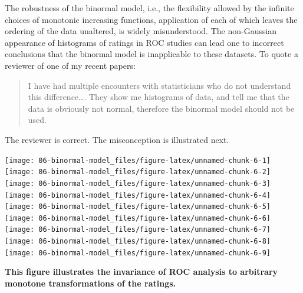\documentclass[
]{book}
\begin{document}
The robustness of the binormal model, i.e., the flexibility allowed by the infinite choices of monotonic increasing functions, application of each of which leaves the ordering of the data unaltered, is widely misunderstood. The non-Gaussian appearance of histograms of ratings in ROC studies can lead one to incorrect conclusions that the binormal model is inapplicable to these datasets. To quote a reviewer of one of my recent papers:

\begin{quote}
I have had multiple encounters with statisticians who do not understand this difference\ldots. They show me histograms of data, and tell me that the data is obviously not normal, therefore the binormal model should not be used.
\end{quote}

The reviewer is correct. The misconception is illustrated next.

\texttt{[image: 06-binormal-model\_files/figure-latex/unnamed-chunk-6-1]} \texttt{[image: 06-binormal-model\_files/figure-latex/unnamed-chunk-6-2]} \texttt{[image: 06-binormal-model\_files/figure-latex/unnamed-chunk-6-3]} \texttt{[image: 06-binormal-model\_files/figure-latex/unnamed-chunk-6-4]} \texttt{[image: 06-binormal-model\_files/figure-latex/unnamed-chunk-6-5]} \texttt{[image: 06-binormal-model\_files/figure-latex/unnamed-chunk-6-6]} \texttt{[image: 06-binormal-model\_files/figure-latex/unnamed-chunk-6-7]} \texttt{[image: 06-binormal-model\_files/figure-latex/unnamed-chunk-6-8]} \texttt{[image: 06-binormal-model\_files/figure-latex/unnamed-chunk-6-9]}

\textbf{This figure illustrates the invariance of ROC analysis to arbitrary monotone transformations of the ratings.}
\end{document}
